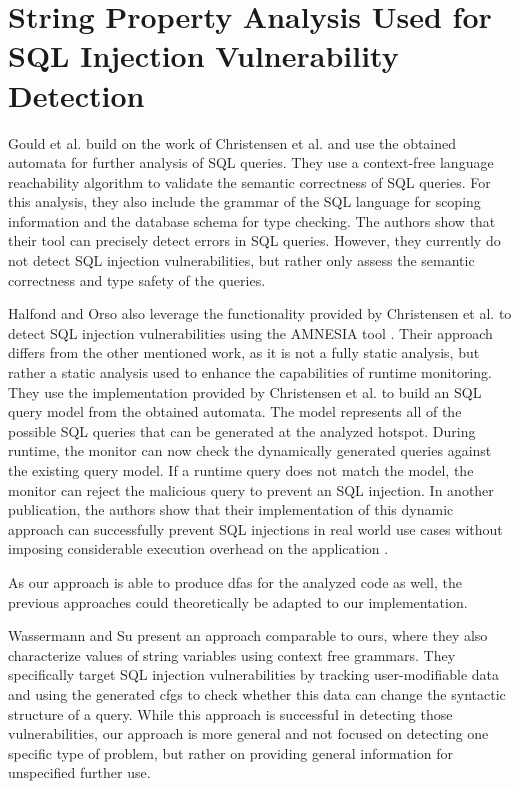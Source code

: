 \section{String Property Analysis Used for SQL Injection Vulnerability Detection}\label{sec:related:stringPropertySql}

Gould et al. \cite{gould2004static} build on the work of Christensen et al. and use the obtained automata for further analysis of SQL queries. They use a context-free language reachability algorithm to validate the semantic correctness of SQL queries. For this analysis, they also include the grammar of the SQL language for scoping information and the database schema for type checking.
The authors show that their tool can precisely detect errors in SQL queries. However, they currently do not detect SQL injection vulnerabilities, but rather only assess the semantic correctness and type safety of the queries.

Halfond and Orso also leverage the functionality provided by Christensen et al. to detect SQL injection vulnerabilities using the AMNESIA tool \cite{amnesia}. Their approach differs from the other mentioned work, as it is not a fully static analysis, but rather a static analysis used to enhance the capabilities of runtime monitoring. They use the implementation provided by Christensen et al. to build an SQL query model from the obtained automata. The model represents all of the possible SQL queries that can be generated at the analyzed hotspot.
During runtime, the monitor can now check the dynamically generated queries against the existing query model. If a runtime query does not match the model, the monitor can reject the malicious query to prevent an SQL injection. In another publication, the authors show that their implementation of this dynamic approach can successfully prevent SQL injections in real world use cases without imposing considerable execution overhead on the application \cite{amnesia_evaluation}.

As our approach is able to produce \acp{dfa} for the analyzed code as well, the previous approaches could theoretically be adapted to our implementation.

Wassermann and Su \cite{sqli_wassermann_su} present an approach comparable to ours, where they also characterize values of string variables using context free grammars. They specifically target SQL injection vulnerabilities by tracking user-modifiable data and using the generated \acp{cfg} to check whether this data can change the syntactic structure of a query. While this approach is successful in detecting those vulnerabilities, our approach is more general and not focused on detecting one specific type of problem, but rather on providing general information for unspecified further use.

